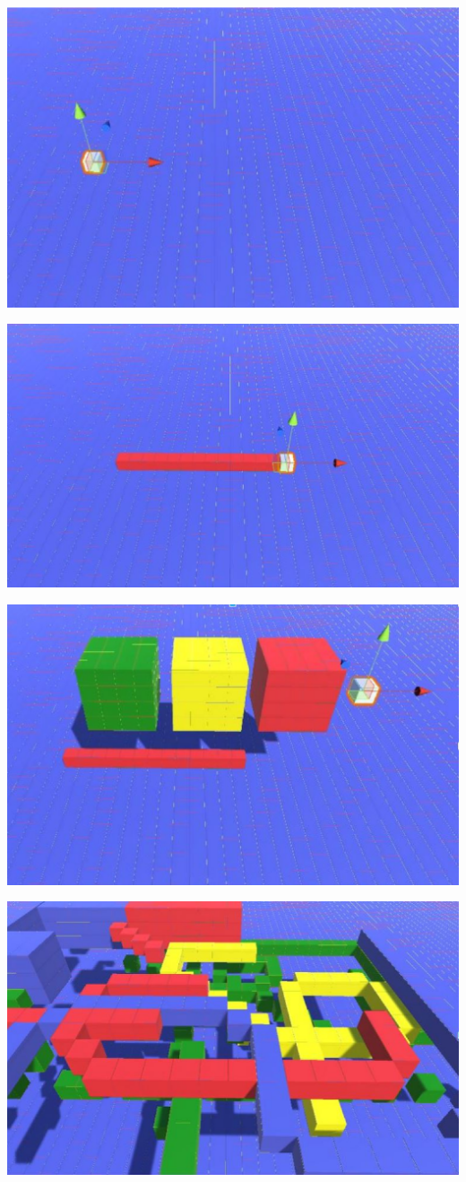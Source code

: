\documentclass[onecolumn, draftclsnofoot,10pt, compsoc]{IEEEtran}
\begin{document}
\includegraphics{image3}

\includegraphics{image4}

\includegraphics{image5}

\includegraphics{image6}
\end{document}
